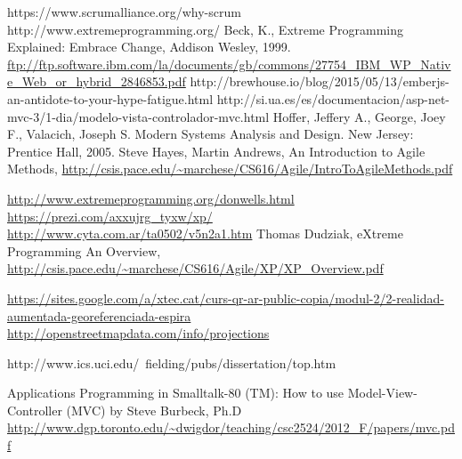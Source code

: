 \begin{thebibliography}{99}
	 https://www.scrumalliance.org/why-scrum
	 http://www.extremeprogramming.org/
	 Beck, K., Extreme Programming Explained: Embrace Change, Addison Wesley, 1999.
	  \url{ftp://ftp.software.ibm.com/la/documents/gb/commons/27754_IBM_WP_Native_Web_or_hybrid_2846853.pdf}
	 http://brewhouse.io/blog/2015/05/13/emberjs-an-antidote-to-your-hype-fatigue.html
	 http://si.ua.es/es/documentacion/asp-net-mvc-3/1-dia/modelo-vista-controlador-mvc.html
	 Hoffer, Jeffery A., George, Joey F., Valacich, Joseph S. Modern Systems Analysis and Design. New Jersey: Prentice Hall, 2005.
	 Steve Hayes, Martin Andrews, An Introduction to Agile Methods, \url{http://csis.pace.edu/~marchese/CS616/Agile/IntroToAgileMethods.pdf}

	  \url{http://www.extremeprogramming.org/donwells.html}
	 \url{https://prezi.com/axxujrg_tyxw/xp/}
	 \url{http://www.cyta.com.ar/ta0502/v5n2a1.htm}
	 Thomas Dudziak, eXtreme Programming
An Overview, \url{http://csis.pace.edu/~marchese/CS616/Agile/XP/XP_Overview.pdf}

	 \url{https://sites.google.com/a/xtec.cat/curs-qr-ar-public-copia/modul-2/2-realidad-aumentada-georeferenciada-espira}
	 \url{http://openstreetmapdata.com/info/projections}

	 http://www.ics.uci.edu/~fielding/pubs/dissertation/top.htm

	 Applications Programming in Smalltalk-80 (TM): How to use Model-View-Controller (MVC) by Steve Burbeck, Ph.D \url{http://www.dgp.toronto.edu/~dwigdor/teaching/csc2524/2012_F/papers/mvc.pdf}



\end{thebibliography}
